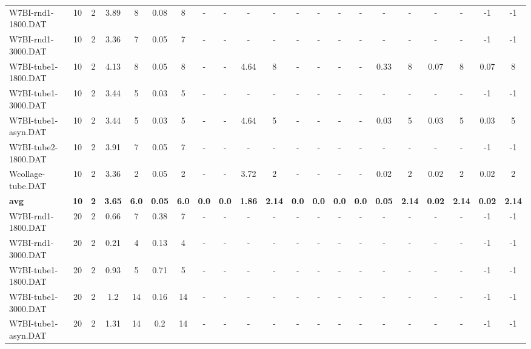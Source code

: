 \begin{sidewaystable}[!ht]
{\begin{tabular}{lcccccccccccccccccccc}
W7BI-rnd1-1800.DAT & 10 & 2 & 3.89 & 8 &  \textcolor{blue2}{0.08} & 8 &  - &  - &  - &  - &  - &  - &  - &  - &  - &  - &  - &  - & -1 & -1 \\
W7BI-rnd1-3000.DAT & 10 & 2 & 3.36 & 7 &  \textcolor{blue2}{0.05} & 7 &  - &  - &  - &  - &  - &  - &  - &  - &  - &  - &  - &  - & -1 & -1 \\
W7BI-tube1-1800.DAT & 10 & 2 & 4.13 & 8 &  \textcolor{blue2}{0.05} & 8 &  - &  - & 4.64 & 8 &  - &  - &  - &  - & 0.33 & 8 & 0.07 & 8 & 0.07 & 8 \\
W7BI-tube1-3000.DAT & 10 & 2 & 3.44 & 5 &  \textcolor{blue2}{0.03} & 5 &  - &  - &  - &  - &  - &  - &  - &  - &  - &  - &  - &  - & -1 & -1 \\
W7BI-tube1-asyn.DAT & 10 & 2 & 3.44 & 5 &  \textcolor{blue2}{0.03} & 5 &  - &  - & 4.64 & 5 &  - &  - &  - &  - &  \textcolor{blue2}{0.03} & 5 &  \textcolor{blue2}{0.03} & 5 &  \textcolor{blue2}{0.03} & 5 \\
W7BI-tube2-1800.DAT & 10 & 2 & 3.91 & 7 &  \textcolor{blue2}{0.05} & 7 &  - &  - &  - &  - &  - &  - &  - &  - &  - &  - &  - &  - & -1 & -1 \\
Wcollage-tube.DAT & 10 & 2 & 3.36 & 2 & 0.05 & 2 &  - &  - & 3.72 & 2 &  - &  - &  - &  - &  \textcolor{blue2}{0.02} & 2 &  \textcolor{blue2}{0.02} & 2 &  \textcolor{blue2}{0.02} & 2 \\
\cline{1-21} \textbf{avg} & \textbf{10} & \textbf{2} & \textbf{3.65} & \textbf{6.0} & \textbf{0.05} & \textbf{6.0} & \textbf{0.0} & \textbf{0.0} & \textbf{1.86} & \textbf{2.14} & \textbf{0.0} & \textbf{0.0} & \textbf{0.0} & \textbf{0.0} & \textbf{0.05} & \textbf{2.14} & \textbf{0.02} & \textbf{2.14} & \textbf{0.02} & \textbf{2.14} \\ \cline{1-21}
W7BI-rnd1-1800.DAT & 20 & 2 & 0.66 & 7 &  \textcolor{blue2}{0.38} & 7 &  - &  - &  - &  - &  - &  - &  - &  - &  - &  - &  - &  - & -1 & -1 \\
W7BI-rnd1-3000.DAT & 20 & 2 & 0.21 & 4 &  \textcolor{blue2}{0.13} & 4 &  - &  - &  - &  - &  - &  - &  - &  - &  - &  - &  - &  - & -1 & -1 \\
W7BI-tube1-1800.DAT & 20 & 2 & 0.93 & 5 &  \textcolor{blue2}{0.71} & 5 &  - &  - &  - &  - &  - &  - &  - &  - &  - &  - &  - &  - & -1 & -1 \\
W7BI-tube1-3000.DAT & 20 & 2 & 1.2 & 14 &  \textcolor{blue2}{0.16} & 14 &  - &  - &  - &  - &  - &  - &  - &  - &  - &  - &  - &  - & -1 & -1 \\
W7BI-tube1-asyn.DAT & 20 & 2 & 1.31 & 14 &  \textcolor{blue2}{0.2} & 14 &  - &  - &  - &  - &  - &  - &  - &  - &  - &  - &  - &  - & -1 & -1 \\

\end{tabular}}
\end{sidewaystable}
